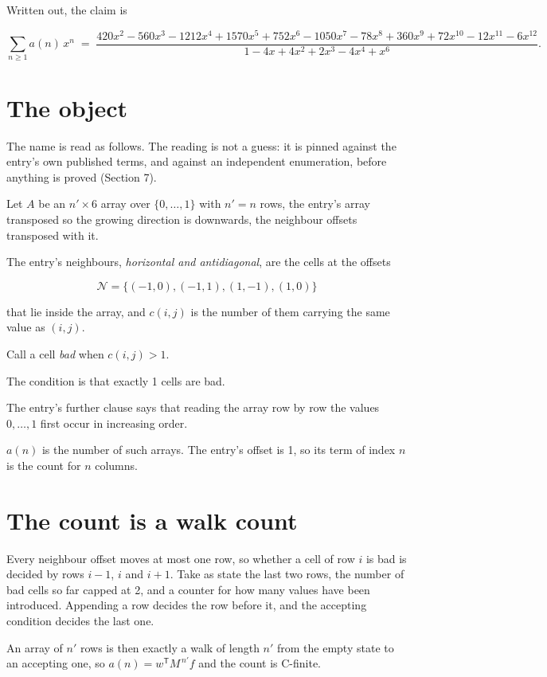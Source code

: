 \documentclass[11pt]{article}
\theoremstyle{definition}
\begin{document}
Written out, the claim is

\[\sum_{n \ge 1} a(n)\,x^n \;=\; \frac{420x^{2} - 560x^{3} - 1212x^{4} + 1570x^{5} + 752x^{6} - 1050x^{7} - 78x^{8} + 360x^{9} + 72x^{10} - 12x^{11} - 6x^{12}}{1 - 4x + 4x^{2} + 2x^{3} - 4x^{4} + x^{6}}.\]

\section{The object}

The name is read as follows. The reading is not a guess: it is pinned against the entry's own published terms, and against an independent enumeration, before anything is proved (Section 7).

Let $A$ be an $n' \times 6$ array over $\{0,\dots,1\}$ with $n' = n$ rows, the entry's array transposed so the growing direction is downwards, the neighbour offsets transposed with it.

The entry's neighbours, {\itshape horizontal and antidiagonal}, are the cells at the offsets

\[\mathcal{N} = \{(-1,0), (-1,1), (1,-1), (1,0)\}\]

that lie inside the array, and $c(i,j)$ is the number of them carrying the same value as $(i,j)$.

Call a cell {\itshape bad} when $c(i,j) > 1$.

The condition is that exactly 1 cells are bad.

The entry's further clause says that reading the array row by row the values $0,\dots,1$ first occur in increasing order.

$a(n)$ is the number of such arrays. The entry's offset is 1, so its term of index $n$ is the count for $n$ columns.

\section{The count is a walk count}

Every neighbour offset moves at most one row, so whether a cell of row $i$ is bad is decided by rows $i-1$, $i$ and $i+1$. Take as state the last two rows, the number of bad cells so far capped at 2, and a counter for how many values have been introduced. Appending a row decides the row before it, and the accepting condition decides the last one.

An array of $n'$ rows is then exactly a walk of length $n'$ from the empty state to an accepting one, so $a(n) = w^{\mathsf T}M^{\,n'}f$ and the count is C-finite.
\end{document}
